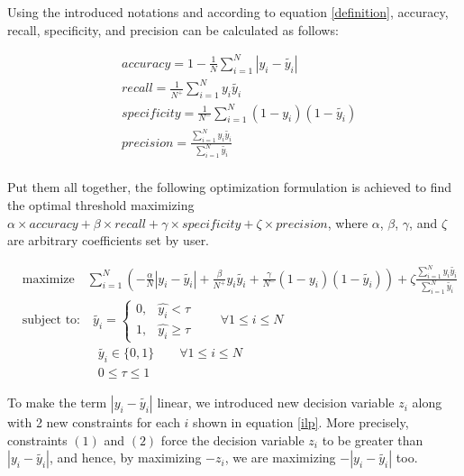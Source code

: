 \documentclass[a4paper]{article}
\begin{document}
Using the introduced notations and according to equation \ref{definition}, accuracy, recall, specificity, and precision can be calculated as follows:

\begin{equation}
\begin{aligned}
&accuracy = 1 - \frac{1}{N} \sum_{i=1}^{N} |y_i - \tilde{y_i}|\\
&recall = \frac{1}{N^+} \sum_{i=1}^{N} y_i \tilde{y_i}\\
&specificity = \frac{1}{N^-} \sum_{i=1}^{N} (1-y_i) (1-\tilde{y_i})\\
&precision = \frac{\sum_{i=1}^{N} y_i \tilde{y_i}}{\sum_{i=1}^{N} \tilde{y_i}}\\
\end{aligned}
\end{equation}

Put them all together, the following optimization formulation is achieved to find the optimal threshold maximizing $\alpha \times \textit{accuracy} + \beta \times \textit{recall} + \gamma \times \textit{specificity} + \zeta \times precision$, where $\alpha$, $\beta$, $\gamma$, and $\zeta$ are arbitrary coefficients set by user.

\begin{equation}
\label{optimization_formulation}
\begin{aligned}
	&\text{maximize} \quad \sum_{i=1}^{N} \left(-\frac{\alpha}{N}|y_i -\tilde{y_i}| + \frac{\beta}{N^+} y_i \tilde{y_i} + \frac{\gamma}{N^-} (1-y_i) (1-\tilde{y_i})\right) + \zeta \frac{\sum_{i=1}^{N} y_i \tilde{y_i}}{\sum_{i=1}^{N} \tilde{y_i}}\\
	&\text{subject to:} \quad \tilde{y_i} = 
	\begin{cases}
	0, & \hat{y_i} < \tau \\
	1, & \hat{y_i} \ge \tau
	\end{cases} \qquad \forall 1\le i \le N\\
	& \qquad \qquad \qquad \tilde{y_i} \in \{0, 1\} \qquad \forall 1\le i \le N\\
	& \qquad \qquad \qquad 0 \le \tau \le 1 \qquad
\end{aligned}
\end{equation}

To make the term $|y_i -\tilde{y_i}|$ linear, we introduced new decision variable $z_i$ along with 2 new constraints for each $i$ shown in equation \ref{ilp}. More precisely, constraints $(1)$ and $(2)$ force the decision variable $z_i$ to be greater than $|y_i - \tilde{y_i}|$, and hence, by maximizing $-z_i$, we are maximizing $-|y_i - \tilde{y_i}|$ too.
\end{document}
